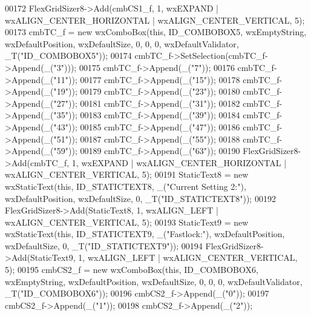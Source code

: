 \begin{DoxyCode}
00172     FlexGridSizer8->Add(cmbCS1\_f, 1, wxEXPAND | wxALIGN\_CENTER\_HORIZONTAL | wxALIGN\_CENTER\_VERTICAL, 5);
00173     cmbTC\_f = \textcolor{keyword}{new} wxComboBox(\textcolor{keyword}{this}, ID\_COMBOBOX5, wxEmptyString, wxDefaultPosition, wxDefaultSize, 0, 0, 0, 
      wxDefaultValidator, _T(\textcolor{stringliteral}{"ID\_COMBOBOX5"}));
00174     cmbTC\_f->SetSelection(cmbTC\_f->Append(\_(\textcolor{stringliteral}{"3"})));
00175     cmbTC\_f->Append(\_(\textcolor{stringliteral}{"7"}));
00176     cmbTC\_f->Append(\_(\textcolor{stringliteral}{"11"}));
00177     cmbTC\_f->Append(\_(\textcolor{stringliteral}{"15"}));
00178     cmbTC\_f->Append(\_(\textcolor{stringliteral}{"19"}));
00179     cmbTC\_f->Append(\_(\textcolor{stringliteral}{"23"}));
00180     cmbTC\_f->Append(\_(\textcolor{stringliteral}{"27"}));
00181     cmbTC\_f->Append(\_(\textcolor{stringliteral}{"31"}));
00182     cmbTC\_f->Append(\_(\textcolor{stringliteral}{"35"}));
00183     cmbTC\_f->Append(\_(\textcolor{stringliteral}{"39"}));
00184     cmbTC\_f->Append(\_(\textcolor{stringliteral}{"43"}));
00185     cmbTC\_f->Append(\_(\textcolor{stringliteral}{"47"}));
00186     cmbTC\_f->Append(\_(\textcolor{stringliteral}{"51"}));
00187     cmbTC\_f->Append(\_(\textcolor{stringliteral}{"55"}));
00188     cmbTC\_f->Append(\_(\textcolor{stringliteral}{"59"}));
00189     cmbTC\_f->Append(\_(\textcolor{stringliteral}{"63"}));
00190     FlexGridSizer8->Add(cmbTC\_f, 1, wxEXPAND | wxALIGN\_CENTER\_HORIZONTAL | wxALIGN\_CENTER\_VERTICAL, 5);
00191     StaticText8 = \textcolor{keyword}{new} wxStaticText(\textcolor{keyword}{this}, ID\_STATICTEXT8, \_(\textcolor{stringliteral}{"Current Setting 2:"}), wxDefaultPosition, 
      wxDefaultSize, 0, _T(\textcolor{stringliteral}{"ID\_STATICTEXT8"}));
00192     FlexGridSizer8->Add(StaticText8, 1, wxALIGN\_LEFT | wxALIGN\_CENTER\_VERTICAL, 5);
00193     StaticText9 = \textcolor{keyword}{new} wxStaticText(\textcolor{keyword}{this}, ID\_STATICTEXT9, \_(\textcolor{stringliteral}{"Fastlock:"}), wxDefaultPosition, wxDefaultSize, 
      0, _T(\textcolor{stringliteral}{"ID\_STATICTEXT9"}));
00194     FlexGridSizer8->Add(StaticText9, 1, wxALIGN\_LEFT | wxALIGN\_CENTER\_VERTICAL, 5);
00195     cmbCS2\_f = \textcolor{keyword}{new} wxComboBox(\textcolor{keyword}{this}, ID\_COMBOBOX6, wxEmptyString, wxDefaultPosition, wxDefaultSize, 0, 0, 0,
       wxDefaultValidator, _T(\textcolor{stringliteral}{"ID\_COMBOBOX6"}));
00196     cmbCS2\_f->Append(\_(\textcolor{stringliteral}{"0"}));
00197     cmbCS2\_f->Append(\_(\textcolor{stringliteral}{"1"}));
00198     cmbCS2\_f->Append(\_(\textcolor{stringliteral}{"2"}));

\end{DoxyCode}
